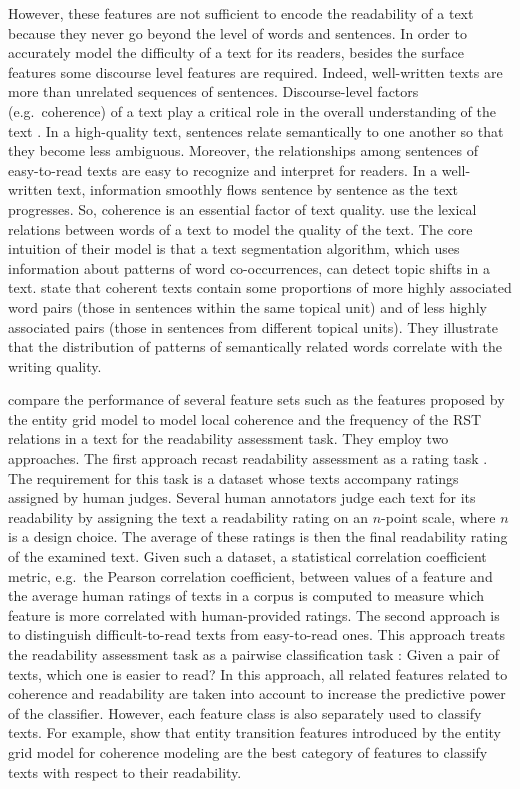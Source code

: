 However, these features are not sufficient to encode the readability of a text because they never go beyond the level of words and sentences. 
In order to accurately model the difficulty of a text for its readers, besides the surface features some discourse level features are required. 
Indeed, well-written texts are more than unrelated sequences of sentences. 
Discourse-level factors (e.g.\ coherence) of a text play a critical role in the overall understanding of the text \cite{pitler08}.  
In a high-quality text, sentences relate semantically to one another so that they become less ambiguous.   
Moreover, the relationships among sentences of \mbox{easy-to-read} texts are easy to recognize and interpret for readers. 
In a well-written text, information smoothly flows sentence by sentence as the text progresses.   
So, coherence is an essential factor of text quality. 
 use the lexical relations between words of a text to model the quality of the text. 
The core intuition of their model is that a text segmentation algorithm, which uses information about patterns of word co-occurrences, can detect topic shifts in a text. 
 state that coherent texts contain some proportions of more highly associated word pairs (those in sentences within the same topical unit) and of less highly associated pairs (those in sentences from different topical units).  
They illustrate that the distribution of patterns of semantically related words correlate with the writing quality. 

 compare the performance of several feature sets such as the features proposed by the entity grid model to model local coherence and the frequency of the RST relations in a text for the readability assessment task. 
They employ two approaches. 
The first approach recast readability assessment as a rating task \cite{pitler08,kate10}. 
The requirement for this task is a dataset whose texts accompany ratings assigned by human judges. 
Several human annotators judge each text for its readability by assigning the text a readability rating on an $n$-point scale, where $n$ is a design choice. 
The average of these ratings is then the final readability rating of the examined text.  
Given such a dataset, a statistical correlation coefficient metric, e.g.\ the Pearson correlation coefficient, between values of a feature and the average human ratings of texts in a corpus is computed to measure which feature is more correlated with human-provided ratings. 
The second approach is to distinguish difficult-to-read texts from easy-to-read ones.  
This approach treats the readability assessment task as a pairwise classification task \cite{pitler08,guinaudeau13,barzilay08}: Given a pair of texts, which one is easier to read? 
In this approach, all related features related to coherence and readability are taken into account to increase the predictive power of the classifier. 
However, each feature class is also separately used to classify texts.   
For example,  show that entity transition features introduced by the entity grid model for coherence modeling are the best category of features to classify texts with respect to their readability. 

